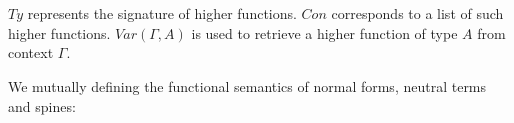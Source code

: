 \begin{code}
\AgdaSpace{}%
\AgdaSpace{}%
\AgdaSpace{}%
\AgdaSpace{}%
\<%
\\
\>[0]\AgdaSpace{}%
\AgdaSpace{}%
\AgdaSpace{}%
\AgdaSymbol{(}\AgdaSpace{}%
\AgdaOperator{\AgdaInductiveConstructor{,}}\AgdaSpace{}%
\AgdaSymbol{)}\AgdaSpace{}%
\AgdaSymbol{=}\AgdaSpace{}%
\<%
\\
\>[0]\AgdaSpace{}%
\AgdaSpace{}%
\AgdaSpace{}%
\AgdaSpace{}%
\AgdaSymbol{(}\AgdaSpace{}%
\AgdaOperator{\AgdaInductiveConstructor{,}}\AgdaSpace{}%
\AgdaSymbol{)}\AgdaSpace{}%
\AgdaSymbol{=}\AgdaSpace{}%
\AgdaSpace{}%
\AgdaSpace{}%
\AgdaSpace{}%
\<%
\end{code}

$Ty$ represents the signature of higher functions. $Con$ corresponds to a list of such higher functions. $Var(\Gamma,A)$ is used to retrieve a higher function of type $A$ from context $\Gamma$.

We mutually defining the functional semantics of normal forms, neutral terms and spines:

\begin{code}[hide]%
\>[0]\<%
\end{code}


